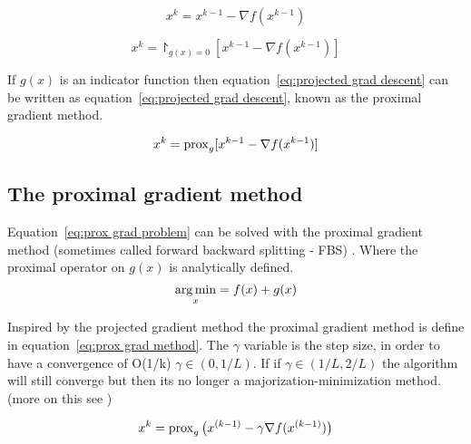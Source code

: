 		\begin{equation}
			x^k = x^{k-1} - \nabla f(x^{k-1})
			\label{eq:grad descent}
		\end{equation}
		
		\begin{equation}
			x^k = \project_{g(x)=0}[ x^{k-1} - \nabla f(x^{k-1})]
			\label{eq:projected grad descent}
		\end{equation}
		
		If $g(x)$ is an indicator function then  equation~\ref{eq:projected grad descent} can be written as equation~\ref{eq:projected grad descent}, known as the proximal gradient method.
		
		\begin{equation}
				x^k = \operatorname{prox}_{g}[ x^{k-1} - \nabla f(x^{k-1})]
			\label{eq:proximal grad descent}
		\end{equation}
	
	\subsection{The proximal gradient method}
		Equation~\ref{eq:prox grad problem} can be solved with the proximal gradient method (sometimes called forward backward splitting - FBS) . Where the proximal operator on $g(x)$ is analytically defined. 
			\begin{equation}
			\underset{x}{\operatorname*{arg\,min}} = f(x) + g(x)
			\label{eq:prox grad problem}
			\end{equation}
		
		Inspired by the projected gradient method the proximal gradient method is define in equation~\ref{eq:prox grad method}. The $\gamma$ variable is the step size, in order to have a convergence of O(1/k) $\gamma \in(0,1/L)$. If if $\gamma \in (1/L,2/L)$ the algorithm will still converge but then its no longer a majorization-minimization method. (more on this see \cite{NealParikh})
		
		\begin{equation}
			x^k = \operatorname{prox}_{g}\big( x^{(k-1)}- \gamma \nabla f(x^{(k-1)})\big)
			\label{eq:prox grad method}
		\end{equation}	
	
